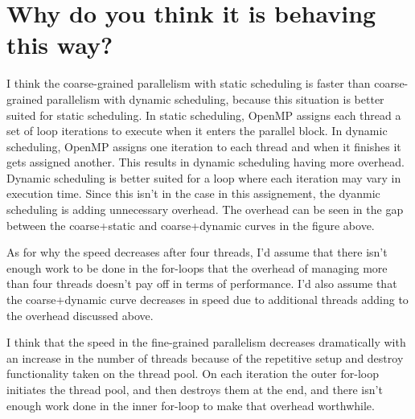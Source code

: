 \documentclass[onecolumn,draftclsnofoot, 10pt, compsoc]{IEEEtran}
\begin{document}
	
\section{Why do you think it is behaving this way?}
	I think the coarse-grained parallelism with static scheduling is faster than coarse-grained parallelism with dynamic scheduling, because this situation is better suited for static scheduling. In static scheduling, OpenMP assigns each thread a set of loop iterations to execute when it enters the parallel block. In dynamic scheduling, OpenMP assigns one iteration to each thread and when it finishes it gets assigned another. This results in dynamic scheduling having more overhead. Dynamic scheduling is better suited for a loop where each iteration may vary in execution time. Since this isn't in the case in this assignement, the dyanmic scheduling is adding unnecessary overhead. The overhead can be seen in the gap between the coarse+static and coarse+dynamic curves in the figure above.
	
	As for why the speed decreases after four threads, I'd assume that there isn't enough work to be done in the for-loops that the overhead of managing more than four threads doesn't pay off in terms of performance. I'd also assume that the coarse+dynamic curve decreases in speed due to additional threads adding to the overhead discussed above.

	I think that the speed in the fine-grained parallelism decreases dramatically with an increase in the number of threads because of the repetitive setup and destroy functionality taken on the thread pool. On each iteration the outer for-loop initiates the thread pool, and then destroys them at the end, and there isn't enough work done in the inner for-loop to make that overhead worthwhile.
	
\end{document}
